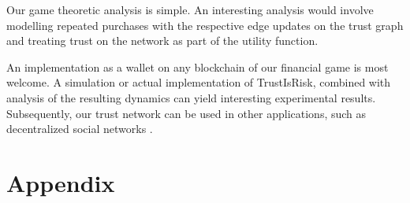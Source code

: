 \documentclass[11pt]{llncs}
\theoremstyle{definition}
\begin{document}
        Our game theoretic analysis is simple. An interesting analysis would involve modelling repeated purchases with the
        respective edge updates on the trust graph and treating trust on the network as part of the utility function.

        An implementation as a wallet on any blockchain of our financial game is most welcome. A simulation or actual
        implementation of TrustIsRisk, combined with analysis of the resulting dynamics can yield interesting experimental
        results. Subsequently, our trust network can be used in other applications, such as decentralized social networks
        \cite{synereo}.
        \newpage

  \section*{Appendix}
\end{document}
